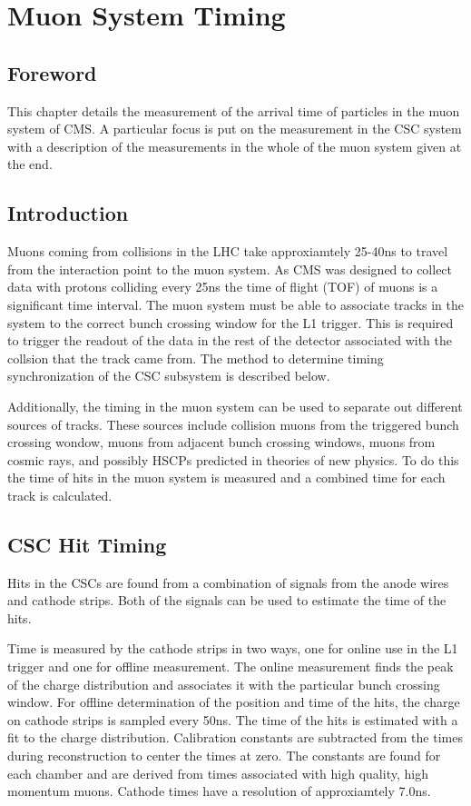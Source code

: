 \chapter{Muon System Timing \label{sec:timing}}

\section{Foreword}
This chapter details the measurement of the arrival time of particles in the muon system of CMS. A particular focus is put on the measurement in the CSC system
with a description of the measurements in the whole of the muon system given at the end. 

\section{Introduction}
Muons coming from collisions in the LHC take approxiamtely 25-40ns to travel from the interaction point to the muon system. As CMS was designed to collect data with protons
colliding every 25ns the time of flight (TOF) of muons is a significant time interval. The muon system must be able to associate tracks in the system to the
correct bunch crossing window for the L1 trigger.
This is required to trigger the readout of the data in the rest of the detector associated with the collsion that the track came from.
The method to determine timing synchronization of the CSC subsystem is described below.

Additionally, the timing in the muon system can be used to separate out different sources of tracks. These sources include collision muons from the
triggered bunch crossing wondow, muons from adjacent bunch crossing windows, muons from cosmic rays, and possibly 
HSCPs predicted in theories of new physics. To do this the time of hits in the muon system is measured and a combined time for each track is calculated.

\section{CSC Hit Timing}
Hits in the CSCs are found from a combination of signals from the anode wires and cathode strips. Both of the signals can be used to estimate the time of the hits.

Time is measured by the cathode strips in two ways, one for online use in the L1 trigger and one for offline measurement. The online measurement finds the peak of the
charge distribution and associates it with the particular bunch crossing window. For offline determination of the position and 
time of the hits, the charge on cathode strips is sampled every 50ns.
The time of the hits is estimated with a fit to the charge distribution. Calibration constants are subtracted from the times during reconstruction to center the times at zero.
The constants are found for each chamber and are derived from times associated with high quality, high momentum muons. Cathode times have a resolution of approxiamtely 7.0ns.

